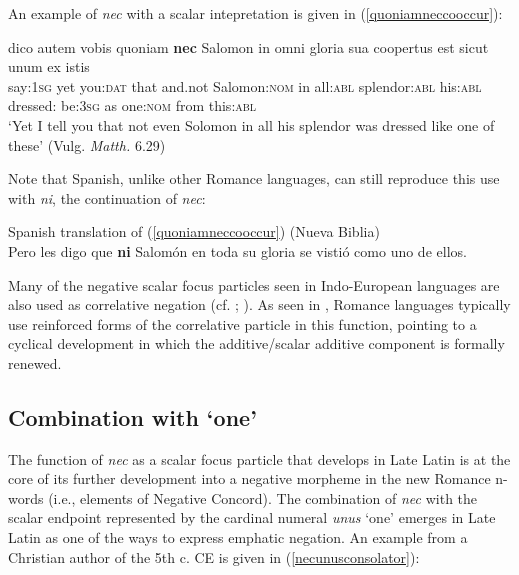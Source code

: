 \documentclass[output=paper,modfonts,nonflat,citecolor=brown,
showindex
]{langsci/langscibook}
\begin{document}
An example of {\emph{nec}} with a scalar intepretation is given in (\ref{quoniamneccooccur}):

{\begin{exe}
\ex \label{quoniamneccooccur} \gll dico autem vobis quoniam {\textbf{nec}} Salomon in omni gloria sua coopertus est sicut unum ex istis\\
say:{\textsc{1sg}} yet you:{\textsc{dat}} that and.not Salomon:{\textsc{nom}} in all:{\textsc{abl}} splendor:{\textsc{abl}} his:{\textsc{abl}} dressed:{\textsc{\ptcp}} be:{\textsc{3sg}} as one:{\textsc{nom}} from this:{\textsc{abl}}\\

`Yet I tell you that not even Solomon in all his splendor was dressed like one of these' (Vulg. {\emph{Matth.}} 6.29)
\end{exe}}

\noindent Note that Spanish, unlike other Romance languages, can still reproduce this use with {\emph{ni}}, the continuation of {\emph{nec}}:

{\begin{exe}
\ex Spanish translation of (\ref{quoniamneccooccur}) (Nueva Biblia)\\
Pero les digo que {\textbf{ni}} Salom\'on en toda su gloria se visti\'o como uno de ellos.
\end{exe}}

\noindent Many of the negative scalar focus particles seen in Indo-European languages are also used as correlative negation (cf. \citealt[chapter 4]{Koenig91}; \citealt[]{Haspelmath07}). As seen in , Romance languages typically use reinforced forms of the correlative particle in this function, pointing to a cyclical development in which the additive/scalar additive component is formally renewed.

\subsection{Combination with `one'}

The function of {\emph{nec}} as a scalar focus particle that develops in Late Latin is at the core of its further development into a negative morpheme in the new Romance n-words (i.e., elements of Negative Concord). The combination of {\emph{nec}} with the scalar endpoint represented by the cardinal numeral {\emph{unus}} `one' emerges in Late Latin as one of the ways to express emphatic negation. An example from a Christian author of the 5th c. CE is given in (\ref{necunusconsolator}):
\end{document}
